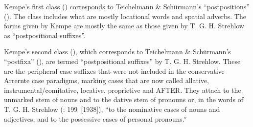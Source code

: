 Kempe’s first class () corresponds to Teichelmann \& Schürmann’s “postpositions” (). The class includes what are mostly locational words and spatial adverbs. The forms given by Kempe are mostly the same as those given by T. G. H. Strehlow as ``postpositional suffixes''.

Kempe’s second class (), which corresponds to Teichelmann \& Schürmann’s “postfixa” (), are termed “postpositional suffixes” by T. G. H. Strehlow. These are the peripheral case suffixes that were not included in the conservative Arrernte case paradigms, marking cases that are now called allative, instrumental/comitative, locative, proprietive and AFTER. They attach to the unmarked stem of nouns and to the dative stem of pronouns or, in the words of T. G. H. Strehlow (\citeyear{strehlow_aranda_1944}: 199~[1938]), “to the nominative cases of nouns and adjectives, and to the possessive cases of personal pronouns.”



